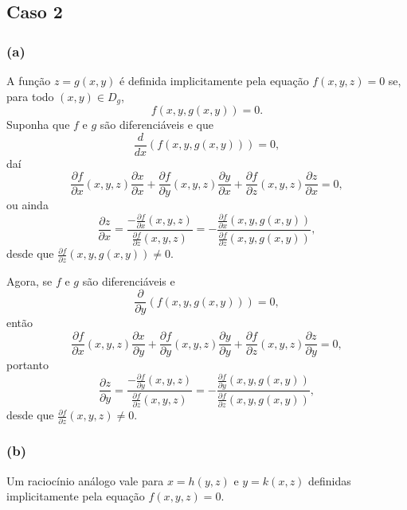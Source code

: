 \subsection{Caso 2}
    \subsubsection{(a)} A função \(z = g(x,y)\) é definida implicitamente pela equação \(f(x,y,z) = 0\) se, para todo \((x,y)\in D_g\), \[f(x,y,g(x,y)) = 0.\] Suponha que \(f\) e \(g\) são diferenciáveis e que \[\frac{d}{dx}(f(x,y,g(x,y))) = 0,\] daí \[\frac{\partial f}{\partial x}(x,y,z) \frac{\partial x}{\partial x} + \frac{\partial f}{\partial y}(x,y,z)\frac{\partial y}{\partial x} + \frac{\partial f}{\partial z}(x,y,z)\frac{\partial z}{\partial x} = 0,\] ou ainda
        \begin{equation}\label{eqn.TeoremaDaFuncaImplicita2}
            \frac{\partial z}{\partial x} = \frac{- \frac{\partial f}{\partial x}(x,y,z)}{\frac{\partial f}{\partial z}(x,y,z)} = - \frac{\frac{\partial f}{\partial x}(x,y,g(x,y))}{\frac{\partial f}{\partial z}(x,y,g(x,y))},
        \end{equation}
    desde que \(\frac{\partial f}{\partial z}(x,y,g(x,y))\neq 0.\)

    Agora, se \(f\) e \(g\) são diferenciáveis e \[\frac{\partial}{\partial y}(f(x,y,g(x,y))) = 0,\] então \[\frac{\partial f}{\partial x}(x,y,z) \frac{\partial x}{\partial y} + \frac{\partial f}{\partial y}(x,y,z)\frac{\partial y}{\partial y} + \frac{\partial f}{\partial z}(x,y,z)\frac{\partial z}{\partial y} = 0,\] portanto
        \begin{equation}\label{eqn.TeoremaDaFuncaImplicita3}
            \frac{\partial z}{\partial y} = \frac{-\frac{\partial f}{\partial y}(x,y,z)}{\frac{\partial f}{\partial z}(x,y,z)} = - \frac{\frac{\partial f}{\partial y}(x,y,g(x,y))}{\frac{\partial f}{\partial z}(x,y,g(x,y))},
        \end{equation}
    desde que \(\frac{\partial f}{\partial z}(x,y,z) \neq 0.\)

    \subsubsection{(b)} Um raciocínio análogo vale para \(x = h(y,z)\) e \(y = k(x,z)\) definidas implicitamente pela equação \(f(x,y,z) = 0\).

